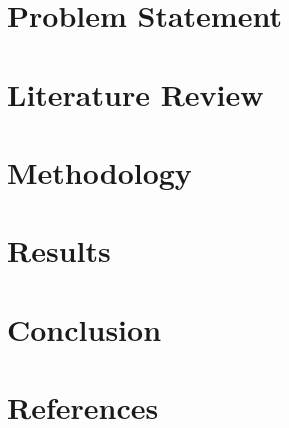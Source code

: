 \documentclass[12pt]{article}
\begin{document}
\section{Problem Statement}
\section{Literature Review}	
\section{Methodology}
\section{Results}
\section{Conclusion}
\section{References}
	
\end{document}
